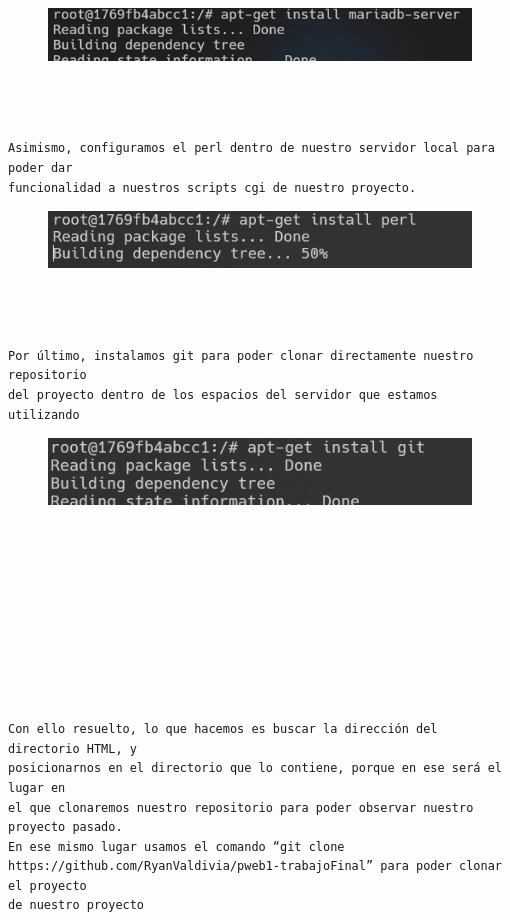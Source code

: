 \documentclass{article}
\begin{document}
\begin{figure}[h]
    \centering
    \includegraphics[width=1\textwidth]{img/5.png}
    \label{fig:imagen}
\end{figure}




\begin{flushleft}
\begin{verbatim}



Asimismo, configuramos el perl dentro de nuestro servidor local para poder dar 
funcionalidad a nuestros scripts cgi de nuestro proyecto.
\end{verbatim}
\end{flushleft}

\begin{figure}[h]
    \centering
    \includegraphics[width=1\textwidth]{img/6.png}
    \label{fig:imagen}
\end{figure}



\begin{flushleft}
\begin{verbatim}



Por último, instalamos git para poder clonar directamente nuestro repositorio
del proyecto dentro de los espacios del servidor que estamos utilizando
\end{verbatim}
\end{flushleft}

\begin{figure}[h]
    \centering
    \includegraphics[width=1\textwidth]{img/7.png}
    \label{fig:imagen}
\end{figure}


\begin{flushleft}
\begin{verbatim}










Con ello resuelto, lo que hacemos es buscar la dirección del directorio HTML, y
posicionarnos en el directorio que lo contiene, porque en ese será el lugar en 
el que clonaremos nuestro repositorio para poder observar nuestro proyecto pasado.
En ese mismo lugar usamos el comando “git clone 
https://github.com/RyanValdivia/pweb1-trabajoFinal” para poder clonar el proyecto
de nuestro proyecto
\end{verbatim}
\end{flushleft}
\end{document}
